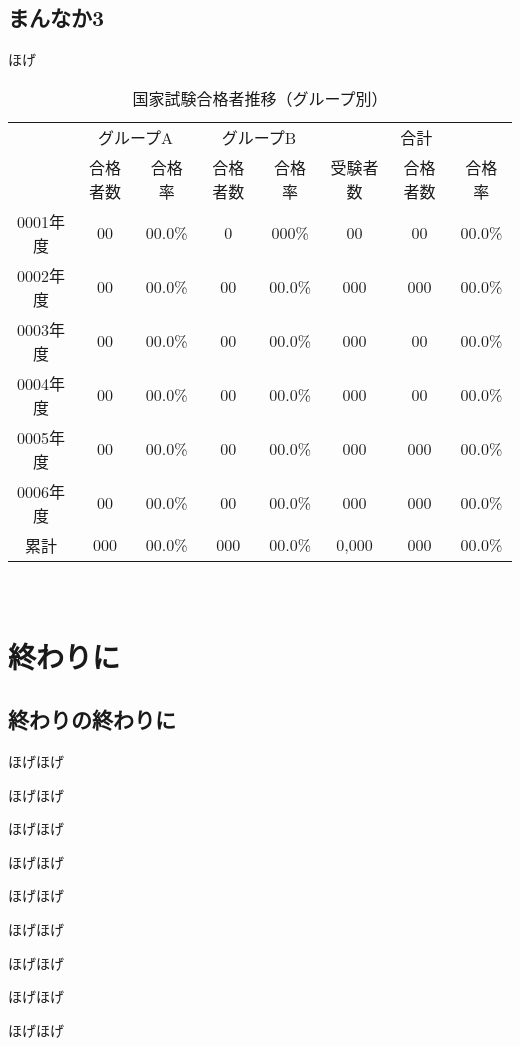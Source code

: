 \documentclass[]{sociologos}
\begin{document}
\subsection{まんなか3}
ほげ
\begin{table}[htbp]
\centering
\caption{国家試験合格者推移（グループ別）}
\footnotesize
\begin{tabular}{cccccccc} \toprule
& \multicolumn{2}{c}{グループA}  & \multicolumn{2}{c}{グループB} & \multicolumn{3}{c}{合計} \\ \cmidrule(lr){2-3} \cmidrule(lr){4-5} \cmidrule(lr){6-8}
& 合格者数 & 合格率 & 合格者数 & 合格率 & 受験者数 & 合格者数 & 合格率\\ \midrule
0001年度 & 00 & 00.0\% & 0 & 000\% & 00 & 00 & 00.0\%\\
0002年度 & 00 & 00.0\% & 00 & 00.0\% & 000 & 000 & 00.0\%\\
0003年度 & 00 & 00.0\% & 00 & 00.0\% & 000 & 00 & 00.0\%\\
0004年度 & 00 & 00.0\% & 00 & 00.0\% & 000 & 00 & 00.0\%\\
0005年度 & 00 & 00.0\% & 00 & 00.0\% & 000 & 000 & 00.0\%\\
0006年度 & 00 & 00.0\% & 00 & 00.0\% & 000 & 000 & 00.0\%\\
累計 & 000 & 00.0\% & 000 & 00.0\% & 0,000 & 000 & 00.0\%\\ \bottomrule
\end{tabular}
\\[5pt]
\end{table}

\section{終わりに}
\subsection{終わりの終わりに}
ほげほげ

ほげほげ

ほげほげ

ほげほげ

ほげほげ

ほげほげ

ほげほげ

ほげほげ

ほげほげ
\end{document}
